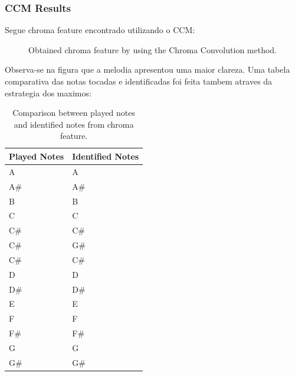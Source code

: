\documentclass{article}
\begin{document}
	\subsubsection{CCM Results}
	Segue chroma feature encontrado utilizando o CCM:
	
	\begin{figure}[h]
	 \centerline{}
	 \caption{Obtained chroma feature by using the Chroma Convolution method.}
	 \label{fig:1-ccm}
	\end{figure}	


	Observa-se na figura  que a melodia apresentou uma maior clareza. Uma tabela comparativa das notas tocadas e identificadas foi feita tambem atraves da estrategia dos maximos:

	\begin{table}[h]
	 \begin{center}
	 \begin{tabular}{|l|l|}
	  \hline
	  Played Notes & Identified Notes \\
	  \hline
	  A  & A \\
	  A\#  & A\# \\
	  B  & B \\
	  C  & C \\
	  C\#  & C\# \\
	  C\#  & G\# \\
	  C\#  & C\# \\
	  D  & D \\
	  D\#  & D\# \\
	  E  & E \\
	  F  & F \\
	  F\#  & F\# \\
	  G  & G \\
	  G\#  & G\# \\
	  \hline
	 \end{tabular}
	\end{center}
	 \caption{Comparison between played notes and identified notes from chroma feature.}
	 \label{tab:table-1-ccm}
	\end{table}
\end{document}
